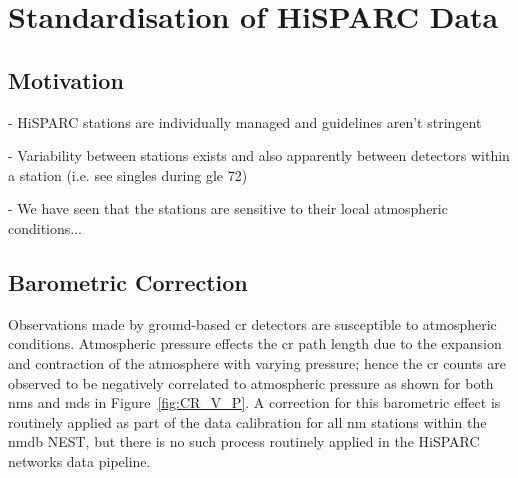 \section{Standardisation of HiSPARC Data}\label{sec:HS_standardisation}

\subsection{Motivation}
- HiSPARC stations are individually managed and guidelines aren't stringent

- Variability between stations exists and also apparently between detectors within a station (i.e. see singles during \gls{gle} 72)

- We have seen that the stations are sensitive to their local atmospheric conditions...

\subsection{Barometric Correction}\label{sec:HS_P_corr}

Observations made by ground-based \gls{cr} detectors are susceptible to atmospheric conditions. Atmospheric pressure effects the \gls{cr} path length due to the expansion and contraction of the atmosphere with varying pressure; hence the \gls{cr} counts are observed to be negatively correlated to atmospheric pressure as shown for both \glspl{nm} and \glspl{md} in Figure~\ref{fig:CR_V_P}. A correction for this barometric effect is routinely applied as part of the data calibration for all \gls{nm} stations within the \gls{nmdb} NEST, but there is no such process routinely applied in the HiSPARC networks data pipeline.


